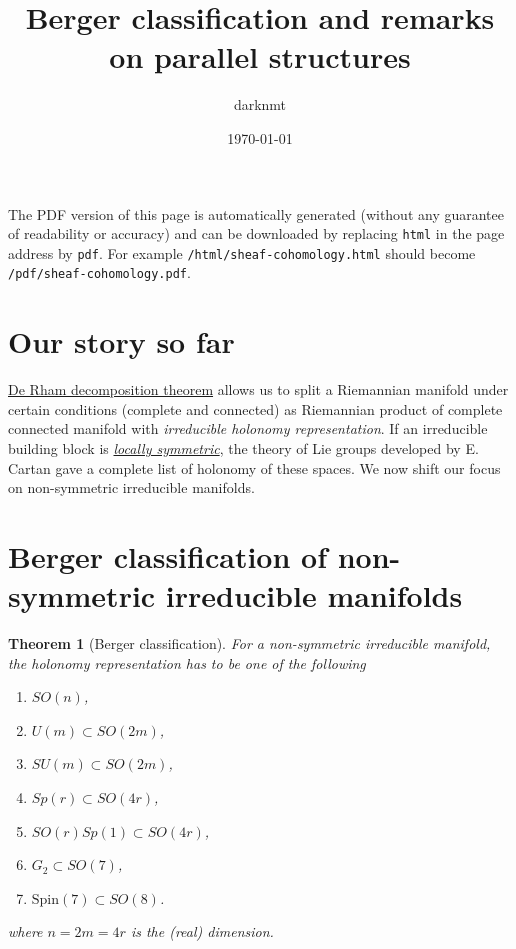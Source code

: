 \documentclass[11pt]{article}
\author{darknmt}
\date{\today}
\title{Berger classification and remarks on parallel structures}
\newtheorem{theorem}{Theorem}
\begin{document}
\maketitle
\tableofcontents

\begin{info}
The PDF version of this page is automatically generated (without any guarantee of
readability or accuracy) and can be downloaded by replacing \texttt{html} in the page address by
\texttt{pdf}. 
For example \texttt{/html/sheaf-cohomology.html} should become \texttt{/pdf/sheaf-cohomology.pdf}.
\end{info}

\section{Our story so far}
\label{sec:org5f81b1f}

\href{./de-rham-decomposition.org}{De Rham decomposition theorem} allows us to split a Riemannian manifold under certain conditions
(complete and connected) as Riemannian product of complete connected manifold with \emph{irreducible
holonomy representation}. If an irreducible building block is \href{./symmetric-space.org}{\emph{locally symmetric}}, the theory of Lie
groups developed by E. Cartan gave a complete list of holonomy of these spaces. We now shift our
focus on non-symmetric irreducible manifolds.


\section{Berger classification of non-symmetric irreducible manifolds}
\label{sec:orgf28312a}

\begin{theorem}[Berger classification]
\label{thm:Berger}
\label{org5e12bbd}
For a non-symmetric irreducible manifold, the holonomy representation has to be one of the
following
\begin{enumerate}
\item \(SO(n)\),
\item \(U(m)\subset SO(2m)\),
\item \(SU(m)\subset SO(2m)\),
\item \(Sp(r) \subset SO(4r)\),
\item \(SO(r)Sp(1) \subset SO(4r)\),
\item \(G_2\subset SO(7)\),
\item \(\text{Spin}(7)\subset SO(8)\).
\end{enumerate}
where \(n=2m=4r\) is the (real) dimension.
\end{theorem}
\end{document}
